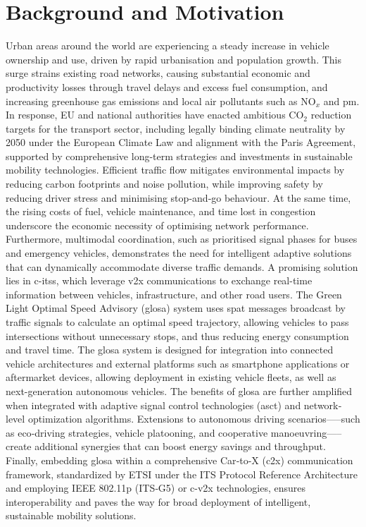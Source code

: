 \section{Background and Motivation}
\label{sec:Background_and_Motivation}

Urban areas around the world are experiencing a steady increase in vehicle ownership and use, driven by rapid urbanisation and population growth. This surge strains existing road networks, causing substantial economic and productivity losses through travel delays and excess fuel consumption, and increasing greenhouse gas emissions and local air pollutants such as NO$_x$ and \ac{pm}. In response, EU and national authorities have enacted ambitious CO$_2$ reduction targets for the transport sector, including legally binding climate neutrality by 2050 under the European Climate Law and alignment with the Paris Agreement, supported by comprehensive long-term strategies and investments in sustainable mobility technologies. \cite{eclts2050} 
\mynewline
Efficient traffic flow mitigates environmental impacts by reducing carbon footprints and noise pollution, while improving safety by reducing driver stress and minimising stop‐and‐go behaviour. At the same time, the rising costs of fuel, vehicle maintenance, and time lost in congestion underscore the economic necessity of optimising network performance. Furthermore, multimodal coordination, such as prioritised signal phases for buses and emergency vehicles, demonstrates the need for intelligent adaptive solutions that can dynamically accommodate diverse traffic demands. 
\mynewline
A promising solution lies in \acp{c-its}, which leverage \ac{v2x} communications to exchange real-time information between vehicles, infrastructure, and other road users. The Green Light Optimal Speed Advisory (\ac{glosa}) system uses \ac{spat} messages broadcast by traffic signals to calculate an optimal speed trajectory, allowing vehicles to pass intersections without unnecessary stops, and thus reducing energy consumption and travel time. \cite{COPPOLA2022103455} The \ac{glosa} system is designed for integration into connected vehicle architectures and external platforms such as smartphone applications or aftermarket devices, allowing deployment in existing vehicle fleets, as well as next-generation autonomous vehicles. 
\mynewline
The benefits of \ac{glosa} are further amplified when integrated with adaptive signal control technologies (\ac{asct}) and network‐level optimization algorithms. Extensions to autonomous driving scenarios—--such as eco‐driving strategies, vehicle platooning, and cooperative manoeuvring—--create additional synergies that can boost energy savings and throughput. Finally, embedding \ac{glosa} within a comprehensive Car‐to‐X (\ac{c2x}) communication framework, standardized by ETSI under the ITS Protocol Reference Architecture and employing IEEE 802.11p (ITS‐G5) or \ac{c-v2x} technologies, ensures interoperability and paves the way for broad deployment of intelligent, sustainable mobility solutions. \cite{etsi_tr_102638_v2_1_1}
